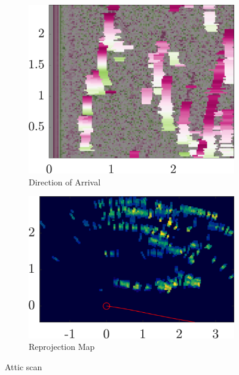 \begin{figure}
\begin{subfigure}[b]{0.25\textwidth}
        \includegraphics[width=.9\textwidth]{gfx/results/attic_doa.png}
        \caption{\small Direction of Arrival}
    \end{subfigure}%
    \begin{subfigure}[b]{0.25\textwidth}   
        \centering 
        \includegraphics[width=.9\textwidth]{gfx/results/attic_reprojection.png}
        \caption{\small Reprojection Map}
    \end{subfigure}%
    \caption{Attic scan}
\end{figure}

